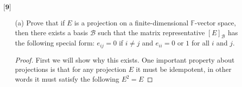 \documentclass[12pt]{article}
\begin{document}
\begin{itemize}
\begin{itemize}
\begin{proof}
        We can take a similar look at $FE = F$ and see if this weren't true there would exist some vector $y$ in $V$ such that,
        \[(F-FE)(y) \neq 0\]
        Assuming this vector did indeed exist,
        \begin{align*}
            (F- FE)(y) &\neq 0 \\
            F(y) - FE(y) &\neq 0 \\
            F(y - E(y)) &\neq 0
        \end{align*}
        it would mean $(y- E(y))$ is not in the kernel of $E$. We see though,
        \begin{align*}
            E(y - E(y)) &\neq 0 \\
            E(y) -E(E(y)) &\neq 0 && \text{Projections are idempotent} \\
            E(y) - E(y) &\neq 0 \\
            E(y) &\neq E(y)
        \end{align*}
        which is again a contradiction. Therefore if the kernel of $E$ and $F$ are equal then $EF = E$ and $FE = F$

        Putting all this together: $\ker(F) = \ker(E)$ if and only if $EF = E$ and $FE = E$
    
    \end{proof}
    
    \end{itemize}
    
    \vspace{.5cm}
    \item[$\textbf{[9]}$]
    \begin{itemize}
    
    \item[(a)]
    Prove that if $E$ is a projection on a finite-dimensional $\mathbb{F}$-vector space, then there exists a basis $\mathcal{B}$ such that the matrix representative $[E]_\mathcal{B}$ has the following special form: $e_{ij} = 0$ if $i \neq j$ and $e_{ii} = 0$ or $1$ for all $i$ and $j$. 

    \begin{proof}
        First we will show why this exists. One important property about projections is that for any projection $E$ it must be idempotent, in other words it must satisfy the following $E^2 = E$


\end{proof}
\end{itemize}
\end{itemize}
\end{document}
